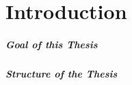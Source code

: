 \chapter{Introduction}
\label{ch:Introduction}


\hint{}


\todots

\paragraph{Goal of this Thesis}

\paragraph{Structure of the Thesis}
